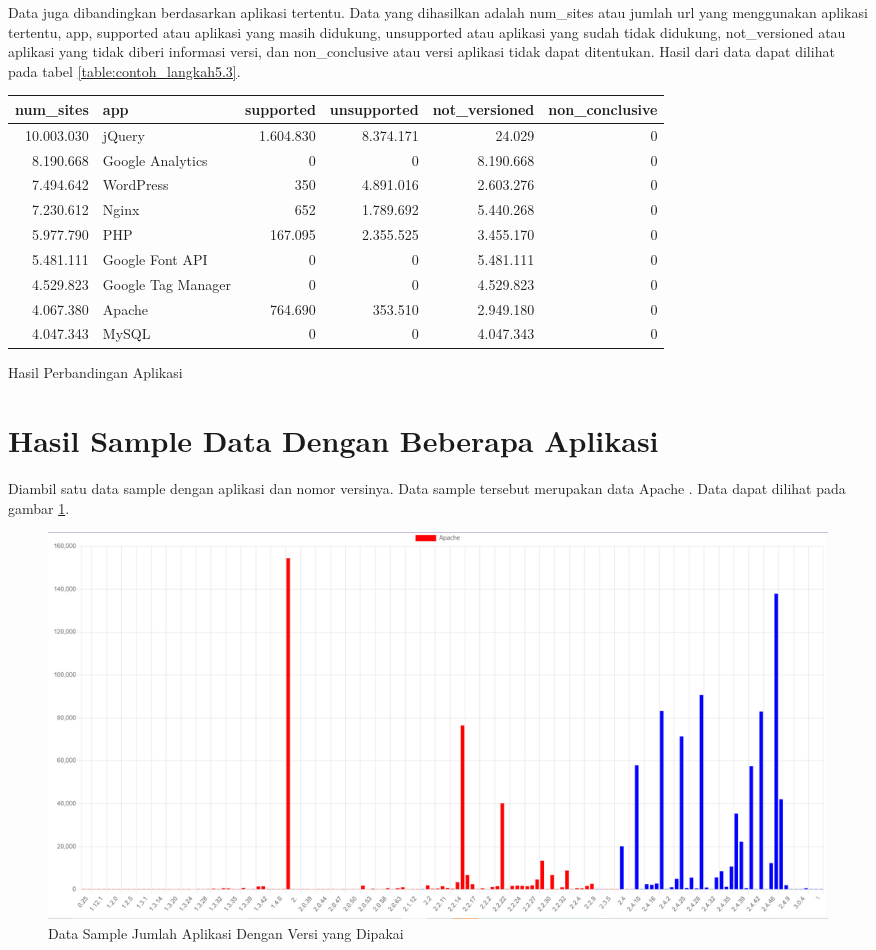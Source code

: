 Data juga dibandingkan berdasarkan aplikasi tertentu. Data yang dihasilkan adalah num\_sites atau jumlah url yang menggunakan aplikasi tertentu, app, supported atau aplikasi yang masih didukung, unsupported atau aplikasi yang sudah tidak didukung, not\_versioned atau aplikasi yang tidak diberi informasi versi, dan non\_conclusive atau versi aplikasi tidak dapat ditentukan. Hasil dari data dapat dilihat pada tabel \ref{table:contoh_langkah5.3}.
\begin{adjustwidth}{-2.5 cm}{-2.5 cm}\centering\begin{threeparttable}[!htb]
	\begin{tabular}{|r|l|r|r|r|r|}
		\hline
		\textbf{num\_sites} & \textbf{app} & \textbf{supported} & \textbf{unsupported} & \textbf{not\_versioned} & \textbf{non\_conclusive}\\
		\hline
		10.003.030 &jQuery &1.604.830 &8.374.171 &24.029 &0 \\
		\hline
		8.190.668 &Google Analytics &0 &0 &8.190.668 &0 \\
		\hline
		7.494.642 &WordPress &350 &4.891.016 &2.603.276 &0 \\
		\hline
		7.230.612 &Nginx &652 &1.789.692 &5.440.268 &0 \\
		\hline
		5.977.790 &PHP &167.095 &2.355.525 &3.455.170 &0 \\
		\hline
		5.481.111 &Google Font API &0 &0 &5.481.111 &0 \\
		\hline
		4.529.823 &Google Tag Manager &0 &0 &4.529.823 &0 \\
		\hline
		4.067.380 &Apache &764.690 &353.510 &2.949.180 &0 \\
		\hline
		4.047.343 &MySQL &0 &0 &4.047.343 &0 \\
		\hline
	\end{tabular}
	\caption{Hasil Perbandingan Aplikasi}
	\label{table:contoh_langkah5.3}
\end{threeparttable}\end{adjustwidth}


\section{Hasil Sample Data Dengan Beberapa Aplikasi}
Diambil satu data sample dengan aplikasi dan nomor versinya. Data sample tersebut merupakan data Apache . Data dapat dilihat pada gambar \ref{fig:data_sample_res}.
\begin{figure}[H]
\centering  
\includegraphics[scale=0.4]{Gambar/apache.PNG}  
\caption{Data Sample Jumlah Aplikasi Dengan Versi yang Dipakai} 
\label{fig:data_sample_res} 
\end{figure}